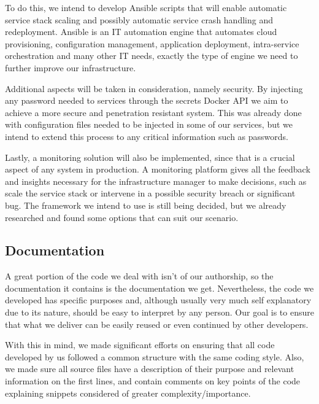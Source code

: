 \documentclass[12pt]{article}
\begin{document}
To do this, we intend to develop Ansible scripts that will enable automatic service stack scaling and possibly automatic service crash handling and redeployment.
Ansible \cite{ansible} is an IT automation engine that automates cloud provisioning, configuration management, application deployment, intra-service orchestration 
and many other IT needs, exactly the type of engine we need to further improve our infrastructure.

Additional aspects will be taken in consideration, namely security. 
By injecting any password needed to services through the secrets Docker API we aim to achieve a more secure and penetration resistant system. 
This was already done with configuration files needed to be injected in some of our services, but we intend to extend this process to any critical information 
such as passwords.

Lastly, a monitoring solution will also be implemented, since that is a crucial aspect of any system in production. 
A monitoring platform gives all the feedback and insights necessary for the infrastructure manager to make decisions, such as scale the service stack or 
intervene in a possible security breach or significant bug. 
The framework we intend to use is still being decided, but we already researched and found some options that can suit our scenario.

\subsection{Documentation} \label{remarks.documentation} %


A great portion of the code we deal with isn't of our authorship, so the documentation it contains is the documentation we get.
Nevertheless, the code we developed has specific purposes and, although usually very much self explanatory due to its nature, should be easy to interpret by any person.
Our goal is to ensure that what we deliver can be easily reused or even continued by other developers.

With this in mind, we made significant efforts on ensuring that all code developed by us followed a common structure with the same coding style.
Also, we made sure all source files have a description of their purpose and relevant information on the first lines, and contain comments on key points of the 
code explaining snippets considered of greater complexity/importance.
\end{document}

